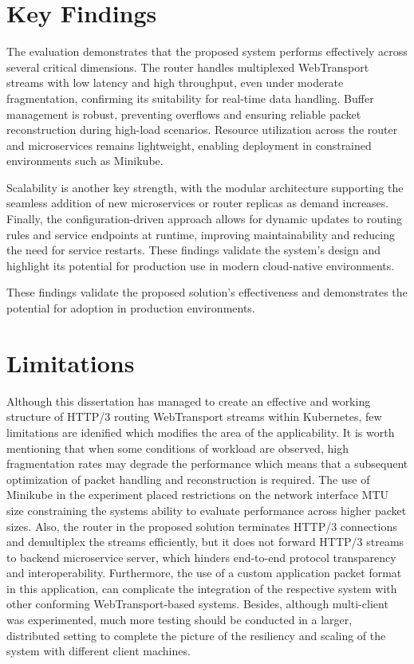 \section{Key Findings}

The evaluation demonstrates that the proposed system performs effectively across several critical dimensions. The router handles multiplexed WebTransport streams with low latency and high throughput, even under moderate fragmentation, confirming its suitability for real-time data handling. Buffer management is robust, preventing overflows and ensuring reliable packet reconstruction during high-load scenarios. Resource utilization across the router and microservices remains lightweight, enabling deployment in constrained environments such as Minikube.

Scalability is another key strength, with the modular architecture supporting the seamless addition of new microservices or router replicas as demand increases. Finally, the configuration-driven approach allows for dynamic updates to routing rules and service endpoints at runtime, improving maintainability and reducing the need for service restarts. These findings validate the system’s design and highlight its potential for production use in modern cloud-native environments.

These findings validate the proposed solution's effectiveness and demonstrates the potential for adoption in production environments.

\section{Limitations}

Although this dissertation has managed to create an effective and working structure of HTTP/3 routing WebTransport streams within Kubernetes, few limitations are idenified which modifies the area of the applicability. It is worth mentioning that when some conditions of workload are observed, high fragmentation rates may degrade the performance which means that a subsequent optimization of packet handling and reconstruction is required. The use of Minikube in the experiment placed restrictions on the network interface MTU size constraining the systems ability to evaluate performance across higher packet sizes. Also, the router in the proposed solution terminates HTTP/3 connections and demultiplex the streams efficiently, but it does not forward HTTP/3 streams to backend microservice server, which hinders end-to-end protocol transparency and interoperability. Furthermore, the use of a custom application packet format in this application, can complicate the integration of the respective system with other conforming WebTransport-based systems. Besides, although multi-client was experimented, much more testing should be conducted in a larger, distributed setting to complete the picture of the resiliency and scaling of the system with different client machines.

